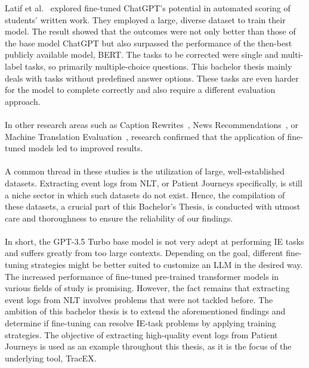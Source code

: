 \newpage
Latif et al.~\cite{latif_fine-tuning_2024} explored fine-tuned ChatGPT's potential in automated scoring of students' written work. They employed a large, diverse dataset to train their model. The result showed that the outcomes were not only better than those of the base model ChatGPT but also surpassed the performance of the then-best publicly available model, BERT. The tasks to be corrected were single and multi-label tasks, so primarily multiple-choice questions. This bachelor thesis mainly deals with tasks without predefined answer options. These tasks are even harder for the model to complete correctly and also require a different evaluation approach.\\\\
In other research areas such as Caption Rewrites~\cite{gladkoff_predictive_2023}, News Recommendations~\cite{li_exploring_2023}, or Machine Translation Evaluation~\cite{wang_mitigating_2023}, research confirmed that the application of fine-tuned models led to improved results.\\\\
A common thread in these studies is the utilization of large, well-established datasets. Extracting event logs from NLT, or Patient Journeys specifically, is still a niche sector in which such datasets do not exist. Hence, the compilation of these datasets, a crucial part of this Bachelor's Thesis, is conducted with utmost care and thoroughness to ensure the reliability of our findings.\\\\
In short, the GPT-3.5 Turbo base model is not very adept at performing IE tasks and suffers greatly from too large contexts. Depending on the goal, different fine-tuning strategies might be better suited to customize an LLM in the desired way. The increased performance of fine-tuned pre-trained transformer models in various fields of study is promising. However, the fact remains that extracting event logs from NLT involves problems that were not tackled before. The ambition of this bachelor thesis is to extend the aforementioned findings and determine if fine-tuning can resolve IE-task problems by applying training strategies. The objective of extracting high-quality event logs from Patient Journeys is used as an example throughout this thesis, as it is the focus of the underlying tool, TracEX.